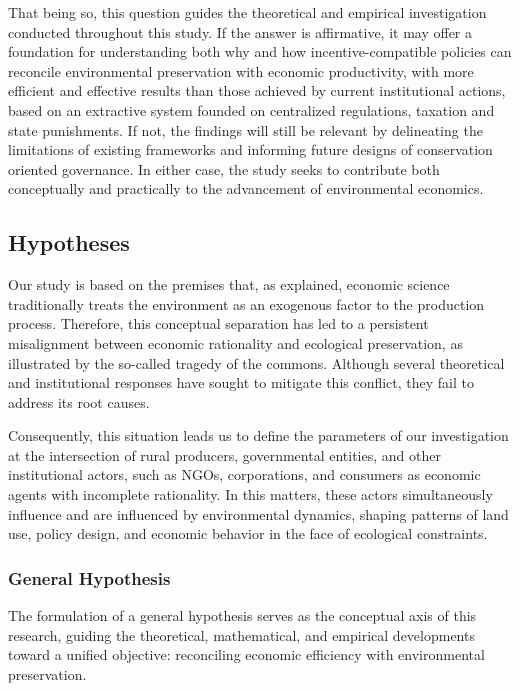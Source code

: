 \vspace{1em}

That being so, this question guides the theoretical and empirical investigation conducted throughout this study. If the answer is affirmative, it may offer a foundation for understanding both why and how incentive-compatible policies can reconcile environmental preservation with economic productivity, with more efficient and effective results than those achieved by current institutional actions, based on an extractive system founded on centralized regulations, taxation and state punishments. If not, the findings will still be relevant by delineating the limitations of existing frameworks and informing future designs of conservation oriented governance. In either case, the study seeks to contribute both conceptually and practically to the advancement of environmental economics.

\subsection{Hypotheses}
Our study is based on the premises that, as explained, economic science traditionally treats the environment as an exogenous factor to the production process. Therefore, this conceptual separation has led to a persistent misalignment between economic rationality and ecological preservation, as illustrated by the so-called tragedy of the commons. Although several theoretical and institutional responses have sought to mitigate this conflict, they fail to address its root causes. 

Consequently, this situation leads us to define the parameters of our investigation at the intersection of rural producers,  governmental entities, and other institutional actors, such as NGOs, corporations, and consumers as economic agents with incomplete rationality. In this matters, these actors simultaneously influence and are influenced by environmental dynamics, shaping patterns of land use, policy design, and economic behavior in the face of ecological constraints.

\subsubsection{General Hypothesis}

The formulation of a general hypothesis serves as the conceptual axis of this research, guiding the theoretical, mathematical, and empirical developments toward a unified objective: reconciling economic efficiency with environmental preservation.

